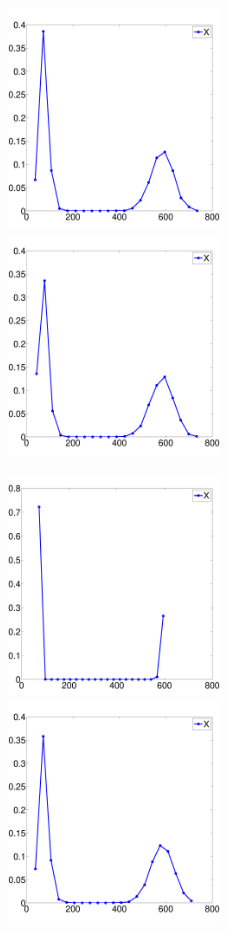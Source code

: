 \documentclass[ugrad,lot,lof,openright,11pt,oneside,onehalfspace]{RUthesis}
\begin{document}
		\begin{figure}[H]
		\centerline{
			\includegraphics[width=0.5\textwidth]{figures/Schlogl_ssa_hist.pdf}
			\includegraphics[width=0.5\textwidth]{figures/Schlogl_tau_hist.pdf}
			}
		\centerline{
			\includegraphics[width=0.5\textwidth]{figures/Schlogl_cle_hist.pdf}
			\includegraphics[width=0.5\textwidth]{figures/Schlogl_gpu_hist.pdf}
}
\end{figure}
\end{document}
